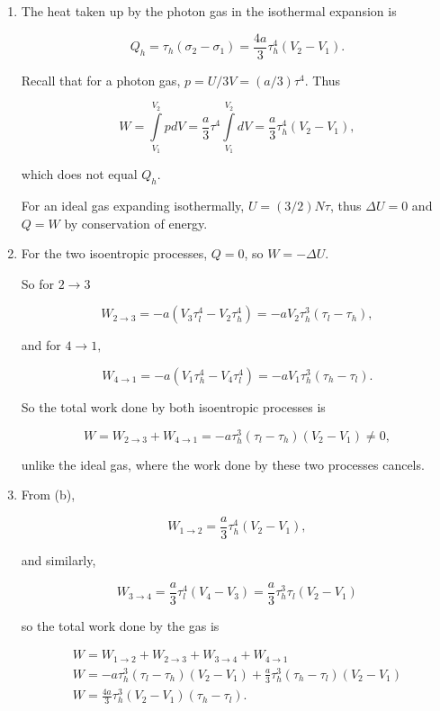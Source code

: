 \documentclass{article}
\begin{document}
\begin{enumerate}
\begin{enumerate}
		\item

		The heat taken up by the photon gas in the isothermal expansion is

		$$Q_h = \tau_h (\sigma_2 - \sigma_1) = \frac{4a}{3}\tau_h^4(V_2 - V_1).$$

		Recall that for a photon gas, $p = U/3V = (a/3) \tau^4$. Thus 

		$$W = \int \limits_{V_1}^{V_2} pdV = \frac{a}{3} \tau^4 \int \limits_{V_1}^{V_2} dV = \frac{a}{3}\tau_h^4(V_2 - V_1),$$

		which does not equal $Q_h$.

		For an ideal gas expanding isothermally, $U = (3/2)N \tau$, thus $\Delta U = 0$ and $Q = W$ by conservation of energy.

		\item

		For the two isoentropic processes, $Q = 0$, so $W = -\Delta U$.

		So for $2 \to 3$

		$$W_{2 \to 3} = -a(V_3 \tau_l^4 - V_2 \tau_h^4) = -aV_2 \tau_h^3 (\tau_l - \tau_h),$$

		and for $4 \to 1,$

		$$W_{4 \to 1} = -a(V_1 \tau_h^4 - V_4 \tau_l^4) = -aV_1 \tau_h^3 (\tau_h - \tau_l).$$

		So the total work done by both isoentropic processes is

		$$W = W_{2 \to 3} + W_{4 \to 1} = -a\tau_h^3(\tau_l - \tau_h)(V_2 - V_1) \neq 0,$$

		unlike the ideal gas, where the work done by these two processes cancels.

		\item

		From (b),

		$$W_{1 \to 2} = \frac{a}{3}\tau_h^4(V_2 - V_1),$$

		and similarly,

		$$W_{3 \to 4} = \frac{a}{3}\tau_l^4(V_4 - V_3) = \frac{a}{3}\tau_h^3 \tau_l (V_2 - V_1)$$

		so the total work done by the gas is

		\begin{gather*}
		W = W_{1 \to 2} + W_{2 \to 3} + W_{3 \to 4} + W_{4 \to 1} \\
		W = -a\tau_h^3(\tau_l - \tau_h)(V_2 - V_1) + \frac{a}{3} \tau_h^3 (\tau_h - \tau_l)(V_2 - V_1) \\
		W = \frac{4a}{3} \tau_h^3 (V_2 - V_1) (\tau_h - \tau_l).
		\end{gather*}


\end{enumerate}
\end{enumerate}
\end{document}
